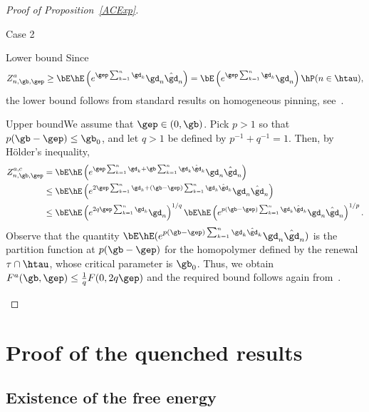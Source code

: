 \begin{proof}[Proof of Proposition~\ref{ACExp}]
\begin{step}{Case 2}
\begin{step}{Lower bound}
Since
\begin{equation}
Z^a_{n,\gb,\gep} \geq \bE \hE \left(e^{\gep \sum_{k=1}^n \gd_k} \gd_n \hat \gd_n \right) = \bE \left(e^{\gep \sum_{k=1}^n \gd_k} \gd_n \right) \hP(n \in \htau),
\end{equation}
the lower bound follows from standard results on homogeneous pinning, see~\cite[Theorem~2.1]{Gi2007}.
\end{step}

\begin{laststep}{Upper bound}We assume that $\gep \in (0,\gb)$. Pick $p > 1$ so that $p (\gb - \gep) \leq \gb_0$, and let $q > 1$ be defined by $p^{-1} + q^{-1} = 1$. Then, by H\"older's inequality,
\begin{equation}
\begin{aligned}
Z^{a,c}_{n,\gb,\gep} &= \bE \hE \left(e^{\gep \sum_{k=1}^n \gd_k + \gb \sum_{k=1}^n \gd_k \hat \gd_k} \gd_n \hat \gd_n \right)\\
&\leq \bE \hE \left(e^{2 \gep \sum_{k=1}^n \gd_k + (\gb - \gep) \sum_{k=1}^n \gd_k \hat \gd_k} \gd_n \hat \gd_n \right)\\
&\leq \bE \hE \left(e^{2 q \gep \sum_{k=1}^n \gd_k} \gd_n \right)^{1/q} \bE \hE \left(e^{p (\gb - \gep) \sum_{k=1}^n \gd_k \hat \gd_k} \gd_n \hat \gd_n \right)^{1/p}.
\end{aligned}
\end{equation}
Observe that the quantity $\bE \hE(e^{p (\gb - \gep) \sum_{k=1}^n \gd_k \hat \gd_k} \gd_n \hat \gd_n)$ is the partition function at $p (\gb - \gep)$ for the homopolymer defined by the renewal $\tau \cap \htau$, whose critical parameter is $\gb_0$. Thus, we obtain $F^a(\gb,\gep) \leq \frac{1}{q} F(0,2 q \gep)$ and the required bound follows again from~\cite[Theorem~2.1]{Gi2007}.
\end{laststep}
\end{step}
\let\qed\relax
\end{proof}

\section{Proof of the quenched results} \label{sec4}

\subsection{Existence of the free energy} \label{sec4.1}

